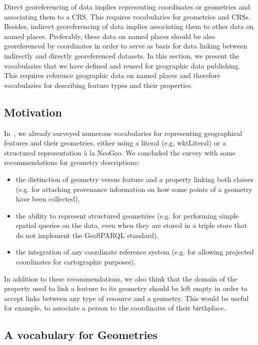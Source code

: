 Direct georeferencing of data implies representing coordinates or geometries and associating them to a CRS.  This requires vocabularies for geometries and CRSs. Besides, indirect georeferencing of data implies associating them to other data on named places. Preferably, these data on named places should be also georeferenced by coordinates in order to serve as basis for data linking between indirectly and directly georeferenced datasets. In this section, we present the vocabularies that we have defined and reused for geographic data publishing.
This requires reference geographic data on named places and therefore vocabularies for describing feature types and their properties. 

\subsection{Motivation}
\label{sec:bpgeo}

In~\cite{Atemezing:TC12}, we already surveyed numerous vocabularies for representing geographical features and their geometries, either using a literal (e.g. wktLiteral) or a structured representation \`a la NeoGeo. We concluded the survey with some recommendations for geometry descriptions:
\begin{itemize}
 \item the distinction of geometry versus feature and a property linking both classes (e.g. for attaching provenance information on how some points of a geometry have been collected),
 \item the ability to represent structured geometries (e.g. for performing simple spatial queries on the data, even when they are stored in a triple store that do not implement the GeoSPARQL standard),
 \item the integration of any coordinate reference system  (e.g. for allowing projected coordinates for cartographic purposes).
\end{itemize}
In addition to these recommendations, we also think that the domain of the property used to link a feature to its geometry should be left empty in order to accept links between any type of resource and a geometry. This would be useful for example, to associate a person to the coordinates of their birthplace.

\subsection{A vocabulary for Geometries} \label{sec:geomvocab}

